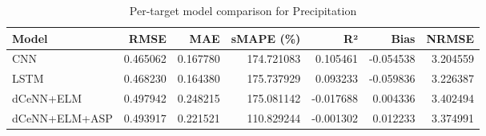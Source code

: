 \begin{table}
\caption{Per-target model comparison for Precipitation}
\begin{tabular}{lrrrrrr}
\toprule
Model & RMSE & MAE & sMAPE (\%) & R² & Bias & NRMSE \\
\midrule
CNN & 0.465062 & 0.167780 & 174.721083 & 0.105461 & -0.054538 & 3.204559 \\
LSTM & 0.468230 & 0.164380 & 175.737929 & 0.093233 & -0.059836 & 3.226387 \\
dCeNN+ELM & 0.497942 & 0.248215 & 175.081142 & -0.017688 & 0.004336 & 3.402494 \\
dCeNN+ELM+ASP & 0.493917 & 0.221521 & 110.829244 & -0.001302 & 0.012233 & 3.374991 \\
\bottomrule
\end{tabular}
\end{table}
